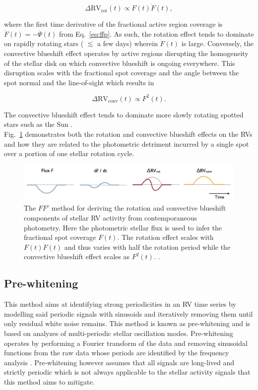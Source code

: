 \begin{equation}
  \Delta \text{RV}_{\text{rot}}(t) \propto F(t) \dot{F}(t),
\end{equation}

\noindent where the first time derivative of the fractional active region coverage is
$\dot{F}(t) = -\dot{\Psi}(t)$ from Eq.~\ref{eq:ffp}. As such, the rotation effect tends to dominate
on rapidly rotating stars (\prot{} $\lesssim$ a few days) 
wherein $\dot{F}(t)$ is large. Conversely, the convective blueshift effect
operates by active regions disrupting the homogeneity of the stellar disk on which convective
blueshift is ongoing everywhere. This disruption scales with the fractional spot coverage and
the angle between the spot normal and the line-of-sight which results in

\begin{equation}
  \Delta \text{RV}_{\text{conv}}(t) \propto F^2(t).
\end{equation}

\noindent The convective blueshift effect tends to dominate more slowly rotating spotted
stars such as the Sun \citep{haywood16}. \\

Fig.~\ref{fig:ffp} demonstrates both the rotation and
convective blueshift effects on the RVs and how they are related to the photometric detriment
incurred by a single spot over a portion of one stellar rotation cycle.

\begin{figure}
  \centering
  \includegraphics[width=0.8\hsize]{figures/ffp.png}
  \caption[Illustration of the $FF'$ method.]
      {The $FF'$ method for deriving the rotation and convective blueshift components
    of stellar RV activity from contemporaneous photometry. Here the photometric stellar flux
    is used to infer the fractional spot coverage $F(t)$. The rotation effect scales with
    $F(t) \dot{F}(t)$ and thus varies with half the rotation period while the convective blueshift
    effect scales as $F^2(t)$. \citep[Image credit:][]{haywood15}.}
  \label{fig:ffp}
\end{figure}


\subsection{Pre-whitening}
This method aims at identifying strong periodicities in an RV time series by modelling
said periodic signals with sinusoids and iteratively removing them
until only residual white noise remains. This method is known as pre-whitening and
is based on analyzes of multi-periodic stellar oscillation modes. Pre-whitening operates
by performing a Fourier
transform of the data and removing sinusoidal functions from the raw data whose periods are
identified by the frequency analysis \citep{queloz09}. Pre-whitening however assumes that all
signals are long-lived and strictly periodic which is not always applicable to the stellar activity
signals that this method aims to mitigate.

